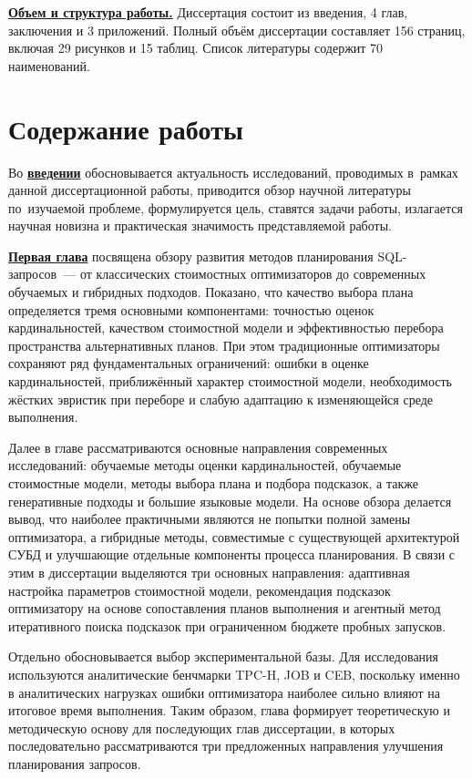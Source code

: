 \underline{\textbf{Объем и структура работы.}} Диссертация состоит из введения, 4 глав, заключения и 3 приложений. Полный объём диссертации составляет 156 страниц, включая 29 рисунков и 15 таблиц. Список литературы содержит 70 наименований.

\section*{Содержание работы}
Во \underline{\textbf{введении}} обосновывается актуальность исследований, проводимых в~рамках данной диссертационной работы, приводится обзор научной литературы по~изучаемой проблеме, формулируется цель, ставятся задачи работы, излагается научная новизна и практическая значимость представляемой работы. 


\underline{\textbf{Первая глава}} посвящена обзору развития методов планирования SQL-запросов~--- от классических стоимостных оптимизаторов до современных обучаемых и гибридных подходов. Показано, что качество выбора плана определяется тремя основными компонентами: точностью оценок кардинальностей, качеством стоимостной модели и эффективностью перебора пространства альтернативных планов. При этом традиционные оптимизаторы сохраняют ряд фундаментальных ограничений: ошибки в оценке кардинальностей, приближённый характер стоимостной модели, необходимость жёстких эвристик при переборе и слабую адаптацию к изменяющейся среде выполнения.

Далее в главе рассматриваются основные направления современных исследований: обучаемые методы оценки кардинальностей, обучаемые стоимостные модели, методы выбора плана и подбора подсказок, а также генеративные подходы и большие языковые модели. На основе обзора делается вывод, что наиболее практичными являются не попытки полной замены оптимизатора, а гибридные методы, совместимые с существующей архитектурой СУБД и улучшающие отдельные компоненты процесса планирования. В связи с этим в диссертации выделяются три основных направления: адаптивная настройка параметров стоимостной модели, рекомендация подсказок оптимизатору на основе сопоставления планов выполнения и агентный метод итеративного поиска подсказок при ограниченном бюджете пробных запусков.

Отдельно обосновывается выбор экспериментальной базы. Для исследования используются аналитические бенчмарки TPC-H, JOB и CEB, поскольку именно в аналитических нагрузках ошибки оптимизатора наиболее сильно влияют на итоговое время выполнения. Таким образом, глава формирует теоретическую и методическую основу для последующих глав диссертации, в которых последовательно рассматриваются три предложенных направления улучшения планирования запросов.

